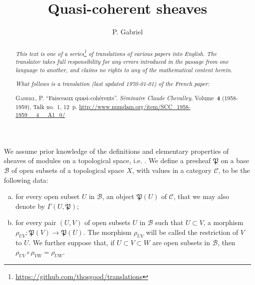 \documentclass{article}
\theoremstyle{plain}
\newcommand{\sh}{\mathfrak}
\newcommand{\cat}{\mathcal}
\newcommand{\oldpage}[1]{\marginpar{\footnotesize$\Big\vert$ \textit{p.~#1}}}
\begin{document}
\renewcommand{\abstractname}{Translator's note.}

\title{Quasi-coherent sheaves}
\author{P. Gabriel}
\date{}
\maketitle

\begin{abstract}
  \renewcommand*{\thefootnote}{\fnsymbol{footnote}}
  \emph{This text is one of a series\footnote{\url{https://github.com/thosgood/translations}} of translations of various papers into English.}
  \emph{The translator takes full responsibility for any errors introduced in the passage from one language to another, and claims no rights to any of the mathematical content herein.}
  
  \emph{What follows is a translation (last updated \today) of the French paper:}

  \medskip\noindent
  \textsc{Gabriel, P.}
  ``Faisceaux quasi-coh\'{e}rents''.
  \emph{S\'{e}minaire Claude Chevalley}, Volume~\textbf{4} (1958-1959), Talk no.~1, 12~p.
  {\footnotesize\url{http://www.numdam.org/item/SCC_1958-1959__4__A1_0/}}
\end{abstract}

\setcounter{footnote}{0}

\tableofcontents



\bigskip\bigskip
\oldpage{1-01}
We assume prior knowledge of the definitions and elementary properties of sheaves of modules on a topological space, i.e. \cite[chapitre~I, \S1; chapitre~II, \S\S1--2]{2}.
We define a presheaf $\sh{P}$ on a base $\mathscr{B}$ of open subsets of a topological space $X$, with values in a category $\cat{C}$, to be the following data:
\begin{enumerate}[(a)]
  \item for every open subset $U$ in $\mathscr{B}$, an object $\sh{P}(U)$ of $\cat{C}$, that we may also denote by $\Gamma(U,\sh{P})$;
  \item for every pair $(U,V)$ of open subsets $U$ in $\mathscr{B}$ such that $U\subset V$, a morphism $\rho_{UV}\colon\sh{P}(V)\to\sh{P}(U)$.
    The morphism $\rho_{UV}$ will be called the restriction of $V$ to $U$.
    We further suppose that, if $U\subset V\subset W$ are open subsets in $\mathscr{B}$, then $\rho_{UV}\circ\rho_{VW}=\rho_{UW}$.
\end{enumerate}
\end{document}
